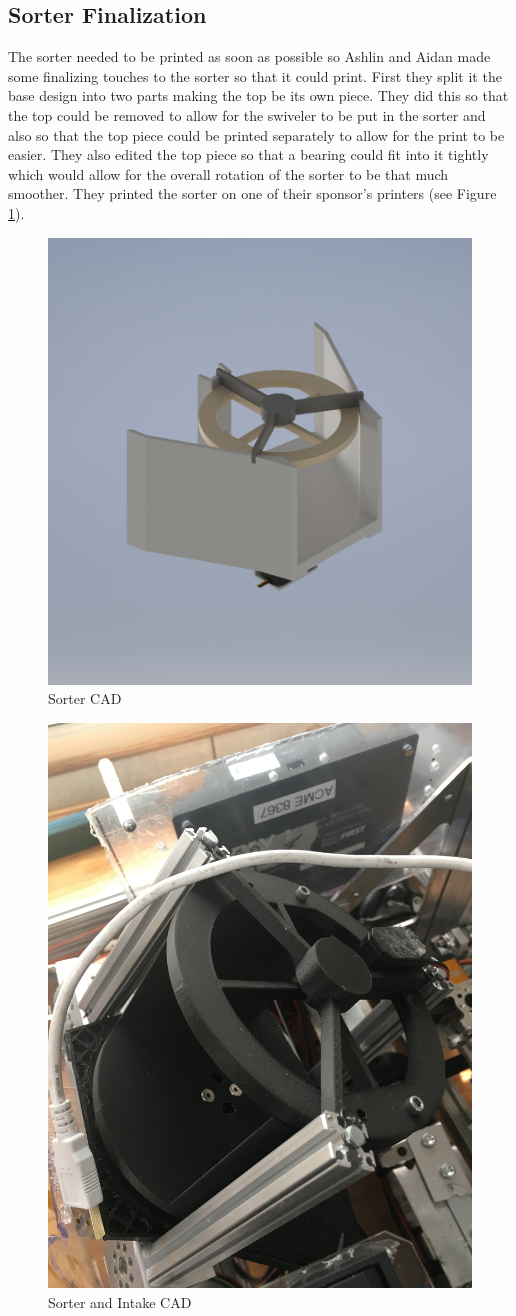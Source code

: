 \documentclass{article}
\newif\ifcontents
\begin{document}
\contentsfalse

 
\subsection{Sorter Finalization}
The sorter needed to be printed as soon as possible so Ashlin and Aidan made some finalizing touches to the sorter so that it could print. First they split it the base design into two parts making the top be its own piece. They did this so that the top could be removed to allow for the swiveler to be put in the sorter and also so that the top piece could be printed separately to allow for the print to be easier. They also edited the top piece so that a bearing could fit into it tightly which would allow for the overall rotation of the sorter to be that much smoother. They printed the sorter on one of their sponsor's printers (see Figure \ref{fig:Sorter CAD}).

\begin{figure}
    \centering
    \includegraphics[width=.6 \textwidth, ]{10_11-05/images/og_sorter[1].png}
    \caption{Sorter CAD}
    \label{fig:Sorter CAD}
\end{figure}

\begin{figure}
    \centering
    \includegraphics[width=.6 \textwidth, angle=270 ]{10_11-05/images/sorter.JPG}
    \caption{Sorter and Intake CAD}
    \label{fig:Intake CAD}
\end{figure}
\end{document}
